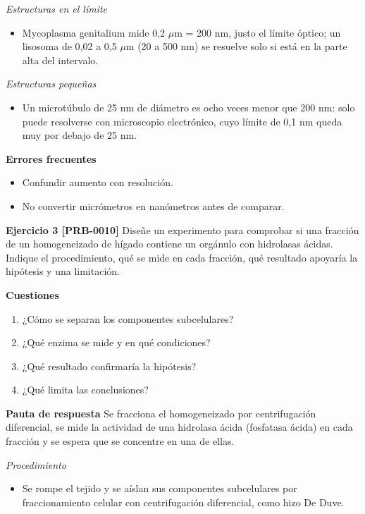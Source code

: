 \documentclass{book}
\begin{document}
\noindent\textit{Estructuras en el límite}
\begin{itemize}
\item Mycoplasma genitalium mide 0,2 \(\mu\)m = 200 nm, justo el límite óptico; un lisosoma de 0,02 a 0,5 \(\mu\)m (20 a 500 nm) se resuelve solo si está en la parte alta del intervalo.
\end{itemize}

\noindent\textit{Estructuras pequeñas}
\begin{itemize}
\item Un microtúbulo de 25 nm de diámetro es ocho veces menor que 200 nm: solo puede resolverse con microscopio electrónico, cuyo límite de 0,1 nm queda muy por debajo de 25 nm.
\end{itemize}

\noindent\textbf{Errores frecuentes}
\begin{itemize}
\item Confundir aumento con resolución.
\item No convertir micrómetros en nanómetros antes de comparar.
\end{itemize}

\noindent\textbf{Ejercicio 3 [PRB-0010]}
Diseñe un experimento para comprobar si una fracción de un homogeneizado de hígado contiene un orgánulo con hidrolasas ácidas. Indique el procedimiento, qué se mide en cada fracción, qué resultado apoyaría la hipótesis y una limitación.


\noindent\textbf{Cuestiones}
\begin{enumerate}
\item ¿Cómo se separan los componentes subcelulares?
\item ¿Qué enzima se mide y en qué condiciones?
\item ¿Qué resultado confirmaría la hipótesis?
\item ¿Qué limita las conclusiones?
\end{enumerate}

\noindent\textbf{Pauta de respuesta}
Se fracciona el homogeneizado por centrifugación diferencial, se mide la actividad de una hidrolasa ácida (fosfatasa ácida) en cada fracción y se espera que se concentre en una de ellas.


\noindent\textit{Procedimiento}
\begin{itemize}
\item Se rompe el tejido y se aíslan sus componentes subcelulares por fraccionamiento celular con centrifugación diferencial, como hizo De Duve.
\end{itemize}
\end{document}
